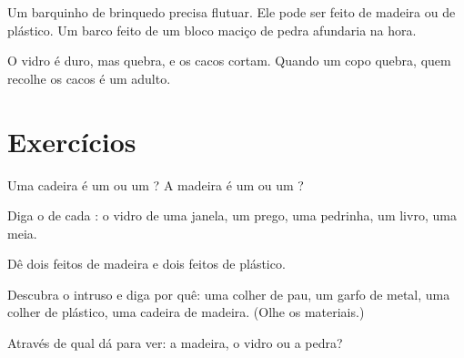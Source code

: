 \begin{example}[Um barquinho]\label{ex:g1:materials-around-us:boat}
Um barquinho de brinquedo precisa flutuar. Ele pode ser feito de madeira
ou de plástico. Um barco feito de um bloco maciço de pedra afundaria na
hora.
\end{example}

\begin{remark}\label{rem:g1:materials-around-us:glass}
O vidro é duro, mas quebra, e os cacos cortam. Quando um copo quebra,
quem recolhe os cacos é um adulto.
\end{remark}

\section{Exercícios}

\begin{exercise}[$\star$]\label{exo:g1:materials-around-us:1}
Uma cadeira é um  ou um ? A madeira é um  ou um
?
\end{exercise}

\begin{exercise}[$\star$]\label{exo:g1:materials-around-us:2}
Diga o  de cada : o vidro de uma janela, um prego, uma
pedrinha, um livro, uma meia.
\end{exercise}

\begin{exercise}[$\star$]\label{exo:g1:materials-around-us:3}
Dê dois  feitos de madeira e dois  feitos de plástico.
\end{exercise}

\begin{exercise}[$\star$]\label{exo:g1:materials-around-us:4}
Descubra o intruso e diga por quê: uma colher de pau, um garfo de
metal, uma colher de plástico, uma cadeira de madeira. (Olhe os
materiais.)
\end{exercise}

\begin{exercise}[$\star$]\label{exo:g1:materials-around-us:5}
Através de qual  dá para ver: a madeira, o vidro ou a pedra?
\end{exercise}


